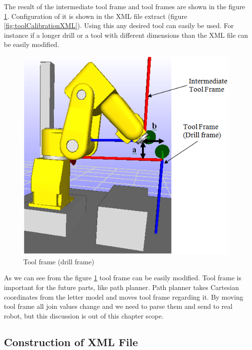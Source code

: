 The result of the intermediate tool frame and tool frames are shown in the figure \ref{fig:toolFrame}. Configuration of it is shown in the XML file extract (figure \ref{fig:toolCalibrationXML}). Using this any desired tool can easily be used. For instance if a longer drill or a tool with different dimensions than the XML file can be easily modified.

\begin{figure}[H]
  \centering
  \includegraphics[scale= 0.6]{source/toolFrame.png}
  \caption{Tool frame (drill frame)}
  \label{fig:toolFrame}
\end{figure}

As we can see from the figure \ref{fig:toolFrame} tool frame can be easily modified. Tool frame is important for the future parts, like path planner. Path planner takes Cartesian coordinates from the letter model and moves tool frame regarding it. By moving tool frame all join values change and we need to parse them and send to real robot, but this discussion is out of this chapter scope.

\subsection{Construction of XML File}

